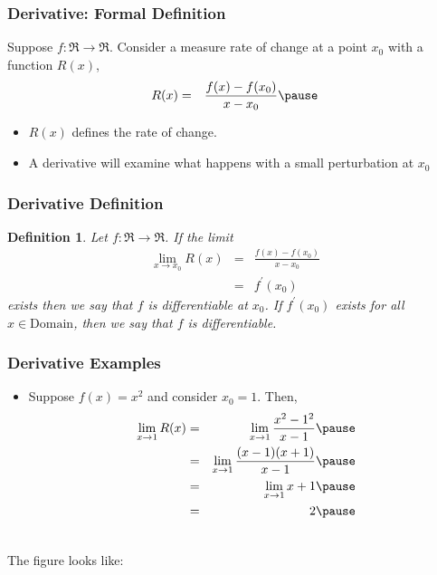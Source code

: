 \documentclass{beamer}
\newtheorem{defn}{Definition}
\numberwithin{equation}{section}
\begin{document}
\begin{frame}
\frametitle{Derivative: Formal Definition}
Suppose $f:\Re \rightarrow \Re$. \pause Consider a measure rate of change at a point $x_{0}$ with a function $R(x)$, \pause 
\begin{eqnarray}
R(x) & = & \frac{f(x) - f(x_{0}) }{ x- x_{0} } \nonumber  \pause 
\end{eqnarray}
\begin{itemize}
\item[-] $R(x)$ defines the rate of change. \pause 
\item[-] A derivative will examine what happens with a small perturbation at $x_{0}$
\end{itemize}

\end{frame}



\begin{frame}
\frametitle{Derivative Definition}

\begin{defn}
Let $f:\Re \rightarrow \Re$.  If the limit
\begin{eqnarray}
\lim_{x\rightarrow x_{0}} R(x) & = & \frac{f(x) - f(x_{0}) }{x - x_{0}} \nonumber  \\
& = & f^{'}(x_{0}) \nonumber 
\end{eqnarray}
exists then we say that $f$ is \alert{differentiable} at $x_{0}$.  If $f^{'}(x_{0})$ exists for all $x \in \text{Domain}$, then we say that $f$ is differentiable. 
\end{defn}

\end{frame}



\begin{frame}
\frametitle{Derivative Examples}

\begin{itemize}
\item[-] Suppose $f(x) = x^2$ and consider $x_{0} = 1$.  Then, \pause 
\begin{eqnarray}
\lim_{x\rightarrow 1}R(x) & = & \lim_{x\rightarrow 1} \frac{x^2 - 1^2}{x - 1} \nonumber \pause \\
& = & \lim_{x\rightarrow 1} \frac{(x- 1)(x + 1) }{ x- 1} \nonumber \pause  \\
& = &  \lim_{x\rightarrow 1} x + 1 \nonumber \pause \\
& = & 2 \nonumber \pause 
\end{eqnarray}
\end{itemize}

\ \\The figure looks like:

\end{frame}
\end{document}
